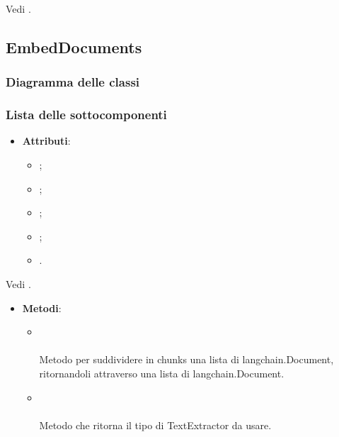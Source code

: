 \documentclass[10pt, a4paper]{article}
\begin{document}
Vedi .



\subsection{EmbedDocuments}
\subsubsection{Diagramma delle classi}
\subsubsection{Lista delle sottocomponenti}

\label{AWSDocumentDettaglio}
\begin{itemize}
    \item \textbf{Attributi}:
    \begin{itemize}
        \item {};
        \item {};
        \item {};
        \item {};
        \item {}.
    \end{itemize}
\end{itemize}   

Vedi .

\label{ChunkerizerDettaglio}
\begin{itemize}
    \item \textbf{Metodi}:
    \begin{itemize}
        \item {}\\ \\
        Metodo per suddividere in chunks una lista di langchain.Document, ritornandoli attraverso una lista di langchain.Document.
        
        \item {}\\ \\
        Metodo che ritorna il tipo di TextExtractor da usare.
    \end{itemize}  
\end{itemize}
\end{document}
